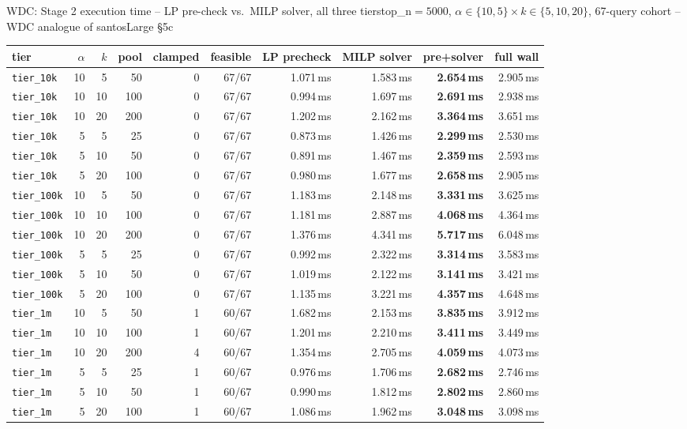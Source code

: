 \documentclass[aspectratio=169,10pt]{beamer}
\begin{document}
\begin{frame}{WDC: Stage 2 execution time -- LP pre-check vs.\ MILP solver, all three tiers}{top\_n$=5000$, $\alpha\in\{10,5\}\times k\in\{5,10,20\}$, 67-query cohort -- WDC analogue of santosLarge \S5c}
\tiny
\begin{center}
\begin{tabular}{lrrrrrrrrr}
\toprule
tier & $\alpha$ & $k$ & pool & clamped & feasible & LP precheck & MILP solver & \textbf{pre+solver} & full wall \\
\midrule
\texttt{tier\_10k} & 10 & 5 & 50 & 0 & 67/67 & 1.071\,ms & 1.583\,ms & \textbf{2.654\,ms} & 2.905\,ms \\
\texttt{tier\_10k} & 10 & 10 & 100 & 0 & 67/67 & 0.994\,ms & 1.697\,ms & \textbf{2.691\,ms} & 2.938\,ms \\
\texttt{tier\_10k} & 10 & 20 & 200 & 0 & 67/67 & 1.202\,ms & 2.162\,ms & \textbf{3.364\,ms} & 3.651\,ms \\
\texttt{tier\_10k} & 5 & 5 & 25 & 0 & 67/67 & 0.873\,ms & 1.426\,ms & \textbf{2.299\,ms} & 2.530\,ms \\
\texttt{tier\_10k} & 5 & 10 & 50 & 0 & 67/67 & 0.891\,ms & 1.467\,ms & \textbf{2.359\,ms} & 2.593\,ms \\
\texttt{tier\_10k} & 5 & 20 & 100 & 0 & 67/67 & 0.980\,ms & 1.677\,ms & \textbf{2.658\,ms} & 2.905\,ms \\
\texttt{tier\_100k} & 10 & 5 & 50 & 0 & 67/67 & 1.183\,ms & 2.148\,ms & \textbf{3.331\,ms} & 3.625\,ms \\
\texttt{tier\_100k} & 10 & 10 & 100 & 0 & 67/67 & 1.181\,ms & 2.887\,ms & \textbf{4.068\,ms} & 4.364\,ms \\
\texttt{tier\_100k} & 10 & 20 & 200 & 0 & 67/67 & 1.376\,ms & 4.341\,ms & \textbf{5.717\,ms} & 6.048\,ms \\
\texttt{tier\_100k} & 5 & 5 & 25 & 0 & 67/67 & 0.992\,ms & 2.322\,ms & \textbf{3.314\,ms} & 3.583\,ms \\
\texttt{tier\_100k} & 5 & 10 & 50 & 0 & 67/67 & 1.019\,ms & 2.122\,ms & \textbf{3.141\,ms} & 3.421\,ms \\
\texttt{tier\_100k} & 5 & 20 & 100 & 0 & 67/67 & 1.135\,ms & 3.221\,ms & \textbf{4.357\,ms} & 4.648\,ms \\
\texttt{tier\_1m} & 10 & 5 & 50 & 1 & 60/67 & 1.682\,ms & 2.153\,ms & \textbf{3.835\,ms} & 3.912\,ms \\
\texttt{tier\_1m} & 10 & 10 & 100 & 1 & 60/67 & 1.201\,ms & 2.210\,ms & \textbf{3.411\,ms} & 3.449\,ms \\
\texttt{tier\_1m} & 10 & 20 & 200 & 4 & 60/67 & 1.354\,ms & 2.705\,ms & \textbf{4.059\,ms} & 4.073\,ms \\
\texttt{tier\_1m} & 5 & 5 & 25 & 1 & 60/67 & 0.976\,ms & 1.706\,ms & \textbf{2.682\,ms} & 2.746\,ms \\
\texttt{tier\_1m} & 5 & 10 & 50 & 1 & 60/67 & 0.990\,ms & 1.812\,ms & \textbf{2.802\,ms} & 2.860\,ms \\
\texttt{tier\_1m} & 5 & 20 & 100 & 1 & 60/67 & 1.086\,ms & 1.962\,ms & \textbf{3.048\,ms} & 3.098\,ms \\
\bottomrule
\end{tabular}
\end{center}


\end{frame}
\end{document}
